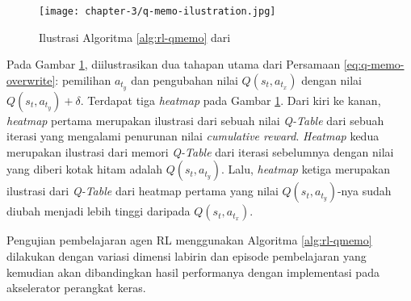 \begin{figure}[H]
	\centering
	\texttt{[image: chapter-3/q-memo-ilustration.jpg]}
	\caption{Ilustrasi Algoritma \ref{alg:rl-qmemo} dari \parencite{mazaya2024reinforcement}}
	\label{fig:q-memo-ilustration}
\end{figure}

Pada Gambar \ref{fig:q-memo-ilustration}, diilustrasikan dua tahapan utama dari Persamaan \ref{eq:q-memo-overwrite}: pemilihan $a_{t_y}$ dan pengubahan nilai  $Q(s_{t},a_{t_x})$ dengan nilai $Q(s_{t},a_{t_y}) + \delta$. Terdapat tiga \textit{heatmap} pada Gambar \ref{fig:q-memo-ilustration}. Dari kiri ke kanan, \textit{heatmap} pertama merupakan ilustrasi dari sebuah nilai \textit{Q-Table} dari sebuah iterasi yang mengalami penurunan nilai \textit{cumulative reward}. \textit{Heatmap} kedua merupakan ilustrasi dari memori \textit{Q-Table} dari iterasi sebelumnya dengan nilai yang diberi kotak hitam adalah $Q(s_{t},a_{t_y})$. Lalu, \textit{heatmap} ketiga merupakan ilustrasi dari \textit{Q-Table} dari heatmap pertama yang nilai $Q(s_{t},a_{t_y})$-nya sudah diubah menjadi lebih tinggi daripada $Q(s_{t},a_{t_x})$.

Pengujian pembelajaran agen \ac{RL} menggunakan Algoritma \ref{alg:rl-qmemo} dilakukan dengan variasi dimensi labirin dan episode pembelajaran yang kemudian akan dibandingkan hasil performanya dengan implementasi pada akselerator perangkat keras.
